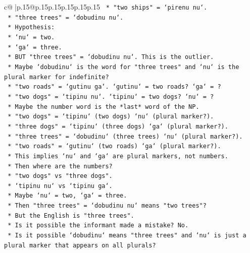 \documentclass{article}
\begin{document}
{\begin{supertabular}{c@{$\;$}|p{.15\linewidth}@{}p{.15\linewidth}p{.15\linewidth}p{.15\linewidth}p{.15\linewidth}p{.15\linewidth}}
{{{\texttt{        *   "two ships" = `pirenu nu`.} \\
\texttt{        *   "three trees" = `dobudinu nu`.} \\
\texttt{        *   Hypothesis:} \\
\texttt{            *   `nu` = two.} \\
\texttt{            *   `ga` = three.} \\
\texttt{            *   BUT "three trees" = `dobudinu nu`. This is the outlier.} \\
\texttt{            *   Maybe `dobudinu` is the word for "three trees" and `nu` is the plural marker for indefinite?} \\
\texttt{            *   "two roads" = `gutinu ga`. `gutinu` = two roads? `ga` = ?} \\
\texttt{            *   "two dogs" = `tipinu nu`. `tipinu` = two dogs? `nu` = ?} \\
\texttt{            *   Maybe the number word is the *last* word of the NP.} \\
\texttt{            *   "two dogs" = `tipinu` (two dogs) `nu` (plural marker?).} \\
\texttt{            *   "three dogs" = `tipinu` (three dogs) `ga` (plural marker?).} \\
\texttt{            *   "three trees" = `dobudinu` (three trees) `nu` (plural marker?).} \\
\texttt{            *   "two roads" = `gutinu` (two roads) `ga` (plural marker?).} \\
\texttt{            *   This implies `nu` and `ga` are plural markers, not numbers.} \\
\texttt{            *   Then where are the numbers?} \\
\texttt{            *   "two dogs" vs "three dogs".} \\
\texttt{            *   `tipinu nu` vs `tipinu ga`.} \\
\texttt{            *   Maybe `nu` = two, `ga` = three.} \\
\texttt{            *   Then "three trees" = `dobudinu nu` means "two trees"?} \\
\texttt{            *   But the English is "three trees".} \\
\texttt{            *   Is it possible the informant made a mistake? No.} \\
\texttt{            *   Is it possible `dobudinu` means "three trees" and `nu` is just a plural marker that appears on all plurals?} \\
}}}
\end{supertabular}}
\end{document}
